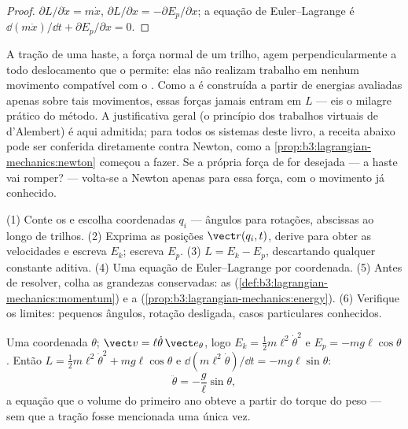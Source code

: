 \begin{proof}
$\partial L/\partial\dot x = m\dot x$, $\partial L/\partial x =
-\partial E_p/\partial x$; a equação de Euler--Lagrange é
$\dd(m\dot x)/\dd t + \partial E_p/\partial x = 0$.
\end{proof}

\begin{remark}\label{rem:b3:lagrangian-mechanics:constraints}
A tração de uma haste, a força normal de um trilho, agem
perpendicularmente a todo deslocamento que o  permite: elas não
realizam trabalho em nenhum movimento compatível com o . Como a
 é construída a partir de energias avaliadas apenas sobre tais
movimentos, essas forças jamais entram em $L$ --- eis o milagre prático
do método. A justificativa geral (o princípio dos trabalhos virtuais de
d'Alembert) é aqui admitida; para todos os sistemas deste livro, a
receita abaixo pode ser conferida diretamente contra Newton, como a
\cref{prop:b3:lagrangian-mechanics:newton} começou a fazer. Se a
própria força de  for desejada --- a haste vai romper? ---
volta-se a Newton apenas para essa força, com o movimento já conhecido.
\end{remark}

\begin{method}\label{met:b3:lagrangian-mechanics:recipe}
(1) Conte os  e escolha coordenadas $q_i$ --- ângulos
para rotações, abscissas ao longo de trilhos. (2) Exprima as posições
$\vect r(q_i, t)$, derive para obter as velocidades e escreva $E_k$;
escreva $E_p$. (3) $L = E_k - E_p$, descartando qualquer constante
aditiva. (4) Uma equação de Euler--Lagrange por coordenada. (5) Antes
de resolver, colha as grandezas conservadas: as 
(\cref{def:b3:lagrangian-mechanics:momentum}) e a 
(\cref{prop:b3:lagrangian-mechanics:energy}). (6) Verifique os limites:
pequenos ângulos, rotação desligada, casos particulares conhecidos.
\end{method}

\begin{example}\label{ex:b3:lagrangian-mechanics:pendulum}
Uma coordenada $\theta$; $\vect v = \ell\dot\theta\,\vect e_\theta$,
logo $E_k = \tfrac12 m\ell^2\dot\theta^2$ e
$E_p = -mg\ell\cos\theta$. Então
$L = \tfrac12 m\ell^2\dot\theta^2 + mg\ell\cos\theta$ e
$\dd(m\ell^2\dot\theta)/\dd t = -mg\ell\sin\theta$:
\[
\ddot\theta = -\frac{g}{\ell}\sin\theta ,
\]
a equação que o volume do primeiro ano obteve a partir do torque do
peso --- sem que a tração fosse mencionada uma única vez.
\end{example}

